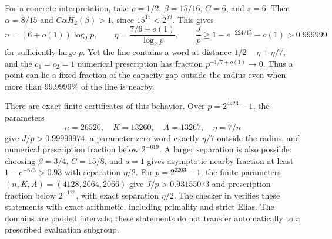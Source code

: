 For a concrete interpretation, take $\rho=1/2$, $\beta=15/16$,
$C=6$, and $s=6$. Then $\alpha=8/15$ and
$C\alpha H_2(\beta)>1$, since $15^{15}<2^{59}$.
This gives
\begin{equation}\label{fg:seven-gap-example}
 n=(6+o(1))\log_2p,\qquad
 \eta=\frac{7/6+o(1)}{\log_2p},\qquad
 \frac Jp\ge1-e^{-224/15}-o(1)>0.999999
\end{equation}
for sufficiently large $p$. Yet the line contains a word at distance
$1/2-\eta+\eta/7$, and the $c_1=c_2=1$ numerical prescription has
fraction $p^{-1/7+o(1)}\to0$. Thus a point can lie a fixed fraction
of the capacity gap outside the radius even when more than
$99.9999\%$ of the line is nearby.

There are exact finite certificates of this behavior. Over
$p=2^{4423}-1$, the parameters
\[
 n=26520,\quad K=13260,\quad A=13267,\quad \eta=7/n
\]
give $J/p>0.99999974$, a parameter-zero word exactly $\eta/7$ outside
the radius, and numerical prescription fraction below $2^{-619}$.
A larger separation is also possible: choosing
$\beta=3/4$, $C=15/8$, and $s=1$ gives asymptotic nearby fraction
at least $1-e^{-8/3}>0.93$ with separation $\eta/2$.
For $p=2^{2203}-1$, the finite parameters
$(n,K,A)=(4128,2064,2066)$ give $J/p>0.93155073$ and prescription
fraction below $2^{-126}$, with exact separation $\eta/2$.
The checker  in
 verifies these statements with
exact arithmetic, including primality and strict Elias. The domains
are padded intervals; these statements do not transfer automatically
to a prescribed evaluation subgroup.

